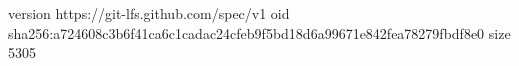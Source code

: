 version https://git-lfs.github.com/spec/v1
oid sha256:a724608c3b6f41ca6c1cadac24cfeb9f5bd18d6a99671e842fea78279fbdf8e0
size 5305
